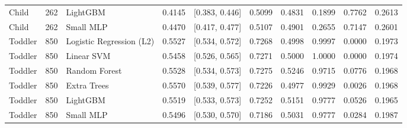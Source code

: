 \begin{table}
\begin{tabular}{lrllllllll}
Child & 262 & LightGBM & 0.4145 & [0.383, 0.446] & 0.5099 & 0.4831 & 0.1899 & 0.7762 & 0.2613 \\
Child & 262 & Small MLP & 0.4470 & [0.417, 0.477] & 0.5107 & 0.4901 & 0.2655 & 0.7147 & 0.2601 \\
Toddler & 850 & Logistic Regression (L2) & 0.5527 & [0.534, 0.572] & 0.7268 & 0.4998 & 0.9997 & 0.0000 & 0.1973 \\
Toddler & 850 & Linear SVM & 0.5458 & [0.526, 0.565] & 0.7271 & 0.5000 & 1.0000 & 0.0000 & 0.1974 \\
Toddler & 850 & Random Forest & 0.5528 & [0.534, 0.573] & 0.7275 & 0.5246 & 0.9715 & 0.0776 & 0.1968 \\
Toddler & 850 & Extra Trees & 0.5570 & [0.539, 0.577] & 0.7226 & 0.4977 & 0.9929 & 0.0026 & 0.1968 \\
Toddler & 850 & LightGBM & 0.5519 & [0.533, 0.573] & 0.7252 & 0.5151 & 0.9777 & 0.0526 & 0.1965 \\
Toddler & 850 & Small MLP & 0.5496 & [0.530, 0.570] & 0.7186 & 0.5031 & 0.9777 & 0.0284 & 0.1987 \\
\bottomrule
\end{tabular}
\end{table}
